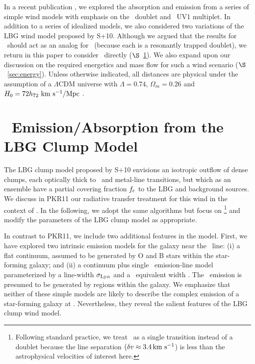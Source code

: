 \documentclass[12pt,preprint]{aastex}
\begin{document}
In a recent publication \citep[][hereafter PKR11]{pkr11}, 
we explored the absorption and emission from
a series of simple wind models with emphasis on the
\mgiid\ doublet and ~UV1 multiplet.  In addition to a
series of idealized models, we also considered two variations of the
LBG wind model proposed by S+10.  Although we argued that the results
for \mgii\ should act as an analog for \lya\ (because each is a
resonantly trapped doublet), we return in this paper to consider
\lya\ directly ($\S$~\ref{sec:lya}).  We also expand upon our discussion on the required
energetics and mass flow for such a wind scenario
($\S$~\ref{sec:energy}).  Unless otherwise indicated, all distances
are physical under the assumption of a $\Lambda$CDM universe with
$\Lambda = 0.74$, $\Omega_m = 0.26$ and 
$H_0 = 72 h_{72} \, \, {\rm km~s^{-1}}/{\rm Mpc}$ \citep{wmap05}.

\section{\lya\ Emission/Absorption from the LBG Clump Model}
\label{sec:lya}

The LBG clump model proposed by S+10 envisions an isotropic outflow of
dense clumps, each optically thick to \lya\ and metal-line
transitions, but which as an ensemble have a partial covering fraction
$f_{\rm c}$ to
the LBG and background sources.  We discuss in PKR11 our radiative
transfer treatment for this wind in the context of \mgiid.  In the
following, we adopt the same algorithms but focus on
\lya\footnote{Following standard practice, we treat \lya\ as a single
  transition instead of a doublet because the line separation $(\delta
  v \approx 3.4 \, {\rm km~s^{-1}}$) is less
  than the astrophysical velocities of interest here.}
and modify the parameters of the LBG clump model as appropriate.

In contrast to PKR11, we include two additional features in the
model.  First, we have explored two intrinsic emission models for the
galaxy near the \lya\ line: 
(i) a flat continuum, assumed to be generated by O and B stars within the
star-forming galaxy; and
(ii) a continuum plus single \lya\ emission-line model parameterized by a
line-width $\sigma_{\rm Ly\alpha}$ and a \lya\ equivalent width \wlya.
The \lya\ emission is presumed to be generated by  regions within the
galaxy.  We emphasize that neither of these simple models are likely
to describe the complex emission of a star-forming galaxy at \lya.
Nevertheless, they reveal the salient features of the
LBG clump wind model.
\end{document}
